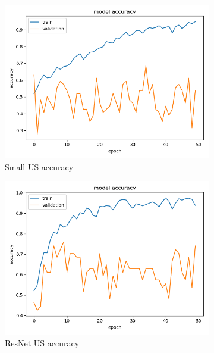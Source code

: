 \begin{figure}[h!]
\centering
\begin{subfigure}[b]{.3\linewidth}
\includegraphics[width=\linewidth]{Figs/small_us_acc.jpg}
\caption{Small US accuracy}
\end{subfigure}
\begin{subfigure}[b]{.3\linewidth}
\includegraphics[width=\linewidth]{Figs/resnet_us_acc.jpg}
\caption{ResNet US accuracy}
\end{subfigure}
\begin{subfigure}[b]{.3\linewidth}

\end{subfigure}
\end{figure}
